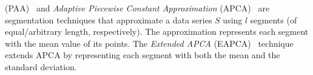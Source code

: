  (PAA)~\cite{journal/kais/Keogh2001} and {\it Adaptive Piecewise Constant Approximation} (APCA)~\cite{journal/acds/Chakrabarti2002} are segmentation techniques that approximate a data series $S$ using $l$ segments (of equal/arbitrary length, respectively). The approximation represents each segment with the mean value of its points. 
The {\it Extended APCA} (EAPCA)~\cite{conf/vldb/Wang2013} technique extends APCA by representing each segment with both the mean and the standard deviation.
\begin{comment}
In order to get a deeper insight into the differences and similarities of the surveyed methods, in particular SFA, SAX and EAPCA, we devise an intuitive formulation which we will use to describe the DFT, PAA and APCA techniques. Given a data series $DS$ of length $n$, and its summarization $DSS$ of length $l$, each dimension $C_i$ in $DSS$ such that $1 \leq i \leq l$ can be mapped to a point $P_i(x_i, y_i)$ in $\mathbb{R}^2$. For DFT, $x_i$ is the endpoint of the $i$th unit segment on the x-axis and $y_i$ is the value of the $i$th fourier coefficient. For the PAA and APCA techniques, $x_i$ is the right endpoint of the $i$th segment of $DS$ and $y_i$ is the mean of the values in the $i$th segment of $DS$. 
\end{comment}

